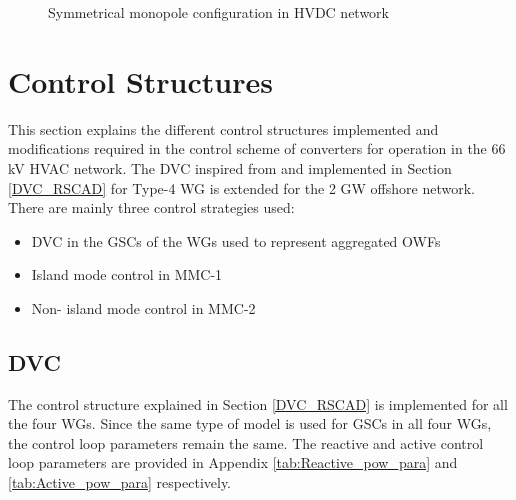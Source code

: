 \begin{figure}[H]
\centering





\caption{Symmetrical monopole configuration in HVDC network}

\end{figure}



\section{Control Structures}\label{control_structures}
This section explains the different control structures implemented and modifications required in the control scheme of converters for operation in the 66 kV \gls{HVAC} network. The \gls{DVC} inspired from \cite{erlich_new_2017} and implemented in Section \ref{DVC_RSCAD} for Type-4 \gls{WG} is extended for the 2 GW offshore network. There are mainly three control strategies used:
\begin{itemize}
    \item \gls{DVC} in the \gls{GSC}s of the \gls{WG}s used to represent aggregated \gls{OWF}s 
    \item Island mode control in \gls{MMC}-1
    \item Non- island mode control in \gls{MMC}-2
\end{itemize}

\subsection{DVC}
The control structure explained in Section \ref{DVC_RSCAD} is implemented for all the four \gls{WG}s. Since the same type of model is used for \gls{GSC}s in all four \gls{WG}s, the control loop parameters remain the same. The reactive and active control loop parameters are provided in Appendix \ref{tab:Reactive_pow_para} and \ref{tab:Active_pow_para} respectively.

